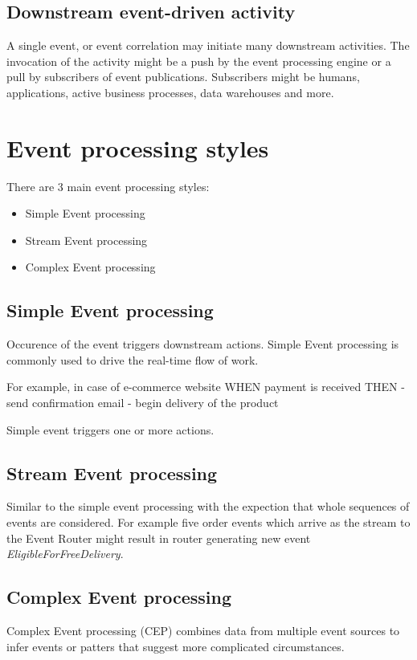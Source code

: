 \documentclass[12pt, a4paper]{article}
\begin{document}
\subsection{Downstream event-driven activity}
A single event, or event correlation may initiate many downstream activities. The invocation of the activity might be a push by the event processing engine or a pull by subscribers of event publications. Subscribers might be humans, applications, active business processes, data warehouses and more.

\section{Event processing styles}
There are 3 main event processing styles:

\begin{itemize}
  \item Simple Event processing
  \item Stream Event processing
  \item Complex Event processing
\end{itemize}

\subsection{Simple Event processing}
Occurence of the event triggers downstream actions. Simple Event processing is commonly used to drive the real-time flow of work.

For example, in case of e-commerce website
WHEN payment is received THEN 
  - send confirmation email
  - begin delivery of the product

Simple event triggers one or more actions.  

\subsection{Stream Event processing}
Similar to the simple event processing with the expection that whole sequences of events are considered. For example five order events which arrive as the stream to the Event Router might result in router generating new event \emph{EligibleForFreeDelivery}.

\subsection{Complex Event processing}
Complex Event processing (CEP) combines data from multiple event sources to infer events or patters that suggest more complicated circumstances. 
  
\end{document}
